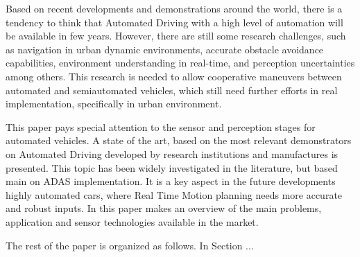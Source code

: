 
Based on recent developments and demonstrations around the world, there is a tendency to think that Automated Driving with a high level of automation will be available in few years. However, there are still some research challenges, such as navigation in urban dynamic environments, accurate obstacle avoidance capabilities, environment understanding in real-time, and perception uncertainties among others. This research is needed to allow cooperative maneuvers between automated and semiautomated vehicles, which still need further efforts in real implementation, specifically in urban environment. 

This paper pays special attention to the sensor and perception stages for automated vehicles. A state of the art, based on the most relevant demonstrators on Automated Driving developed by research institutions and manufactures is presented. This topic has been widely investigated in the literature, but based main on ADAS implementation. It is a key aspect in the future developments highly automated cars, where Real Time Motion planning needs more accurate and robust inputs. In this paper makes an overview of the main problems, application and sensor technologies available in the market.

The rest of the paper is organized as follows. In Section ...
